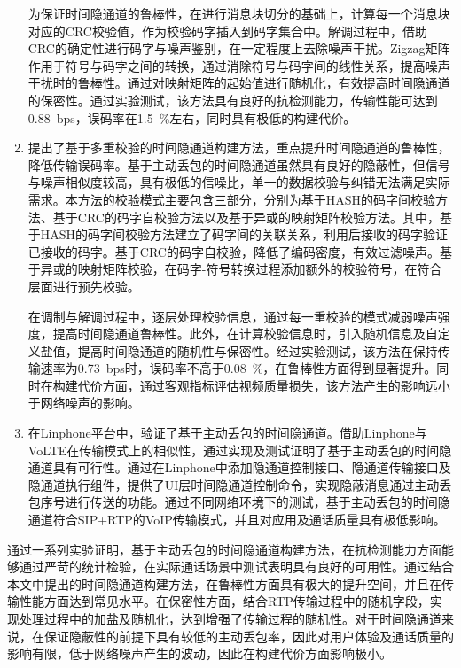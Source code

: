 \begin{conclusion}
\begin{enumerate}
    为保证时间隐通道的鲁棒性，在进行消息块切分的基础上，计算每一个消息块对应的CRC校验值，作为校验码字插入到码字集合中。解调过程中，借助CRC的确定性进行码字与噪声鉴别，在一定程度上去除噪声干扰。Zigzag矩阵作用于符号与码字之间的转换，通过消除符号与码字间的线性关系，提高噪声干扰时的鲁棒性。通过对映射矩阵的起始值进行随机化，有效提高时间隐通道的保密性。通过实验测试，该方法具有良好的抗检测能力，传输性能可达到0.88\ bps，误码率在1.5\ \%左右，同时具有极低的构建代价。
    
    \item
    提出了基于多重校验的时间隐通道构建方法，重点提升时间隐通道的鲁棒性，降低传输误码率。基于主动丢包的时间隐通道虽然具有良好的隐蔽性，但信号与噪声相似度较高，具有极低的信噪比，单一的数据校验与纠错无法满足实际需求。本方法的校验模式主要包含三部分，分别为基于HASH的码字间校验方法、基于CRC的码字自校验方法以及基于异或的映射矩阵校验方法。其中，基于HASH的码字间校验方法建立了码字间的关联关系，利用后接收的码字验证已接收的码字。基于CRC的码字自校验，降低了编码密度，有效过滤噪声。基于异或的映射矩阵校验，在码字-符号转换过程添加额外的校验符号，在符合层面进行预先校验。
    
    在调制与解调过程中，逐层处理校验信息，通过每一重校验的模式减弱噪声强度，提高时间隐通道鲁棒性。此外，在计算校验信息时，引入随机信息及自定义盐值，提高时间隐通道的随机性与保密性。经过实验测试，该方法在保持传输速率为0.73\ bps时，误码率不高于0.08\ \%，在鲁棒性方面得到显著提升。同时在构建代价方面，通过客观指标评估视频质量损失，该方法产生的影响远小于网络噪声的影响。

    \item
    在Linphone平台中，验证了基于主动丢包的时间隐通道。借助Linphone与VoLTE在传输模式上的相似性，通过实现及测试证明了基于主动丢包的时间隐通道具有可行性。通过在Linphone中添加隐通道控制接口、隐通道传输接口及隐通道执行组件，提供了UI层时间隐通道控制命令，实现隐蔽消息通过主动丢包序号进行传送的功能。通过不同网络环境下的测试，基于主动丢包的时间隐通道符合SIP+RTP的VoIP传输模式，并且对应用及通话质量具有极低影响。
\end{enumerate}

通过一系列实验证明，基于主动丢包的时间隐通道构建方法，在抗检测能力方面能够通过严苛的统计检验，在实际通话场景中测试表明具有良好的可用性。通过结合本文中提出的时间隐通道构建方法，在鲁棒性方面具有极大的提升空间，并且在传输性能方面达到常见水平。在保密性方面，结合RTP传输过程中的随机字段，实现处理过程中的加盐及随机化，达到增强了传输过程的随机性。对于时间隐通道来说，在保证隐蔽性的前提下具有较低的主动丢包率，因此对用户体验及通话质量的影响有限，低于网络噪声产生的波动，因此在构建代价方面影响极小。


\end{conclusion}

